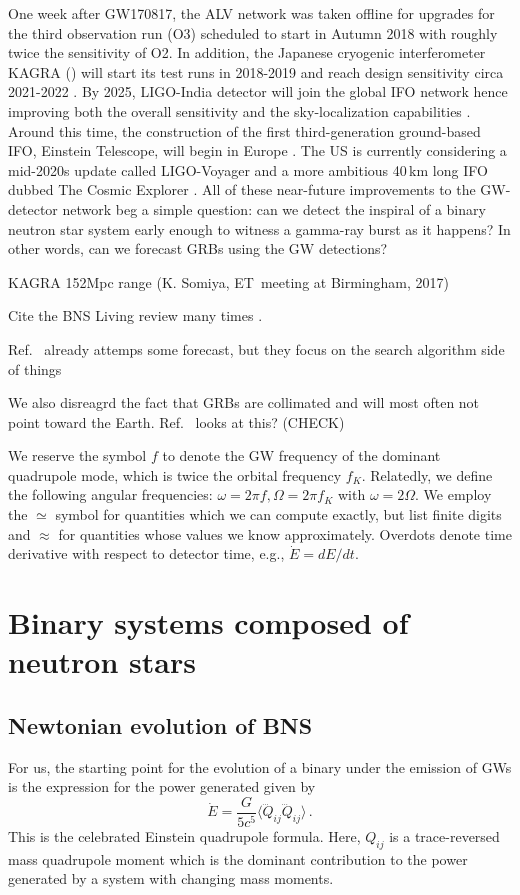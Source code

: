 \documentclass[amsmath,amssymb,aps,floats,amsfonts,notitlepage,superscriptaddress,eqsecnum,nofootinbib,10pt]{revtex4-1}
\newcommand{\f}{\frac}
\newcommand{\be}{\begin{equation}}
\newcommand{\ee}{\end{equation}}
\begin{document}
One week after GW170817, the ALV network was taken offline for upgrades for the third observation run (O3) 
scheduled to start in Autumn 2018 with roughly twice the sensitivity of O2.
In addition, the Japanese cryogenic interferometer KAGRA (\cite{KAGRA, KAGRA2}) will start its test runs in 2018-2019 and reach design sensitivity circa 2021-2022 \cite{Akutsu:2017thy, Aasi:2013wya}. By 2025, LIGO-India detector will join the global IFO network hence improving both the overall sensitivity and the sky-localization capabilities \cite{Aasi:2013wya}.
Around this time, the construction of the first third-generation ground-based IFO, Einstein Telescope, will begin in Europe \cite{ET_doc}. 
The US is currently considering a mid-2020s update called LIGO-Voyager \cite{LIGO_Voy} and a more ambitious 40\,km long IFO dubbed The Cosmic Explorer \cite{CE}.
All of these near-future improvements to the GW-detector network beg a simple question: can we detect the inspiral of a binary neutron star system
early enough to witness a gamma-ray burst as it happens? In other words, can we forecast GRBs using the GW detections?


KAGRA 152Mpc range (K. Somiya, ET meeting at Birmingham, 2017)

Cite the BNS Living review many times \cite{Faber:2012rw}.

Ref.~\cite{Cannon:2011vi} already attemps some forecast, but they focus on the search algorithm side of things

We also disreagrd the fact that GRBs are collimated and will most often not point toward the Earth. Ref.~\cite{Patricelli:2016bkt} looks at this? (CHECK)

We reserve the symbol $f$ to denote the GW frequency of the dominant quadrupole mode, which is twice the orbital frequency $f_K$. 
Relatedly, we define the following angular frequencies: $\omega = 2\pi f, \Omega=2\pi f_K$ with $\omega=2\Omega$.
We employ the $\simeq$ symbol for quantities which we can compute exactly, but list finite digits and $\approx$ for quantities whose values we know approximately.
Overdots denote time derivative with respect to detector time, e.g., $\dot{E} =dE/dt$.

\section{Binary systems composed of neutron stars}\label{sec:BNS_inspiral}
\subsection{Newtonian evolution of BNS}
For us, the starting point for the evolution of a binary under the emission of GWs is the expression for the power generated given by 
%
\be
\dot{E} = \f{G}{5c^5}\langle \dddot{Q}_{ij}\dddot{Q}_{ij} \rangle \label{eq:Edot_quadrupole}\, .
\ee
%
This is the celebrated Einstein quadrupole formula. 
Here, $Q_{ij}$ is a trace-reversed mass quadrupole moment which
is the dominant contribution to the power generated %
by a system with changing mass moments. 
\end{document}
